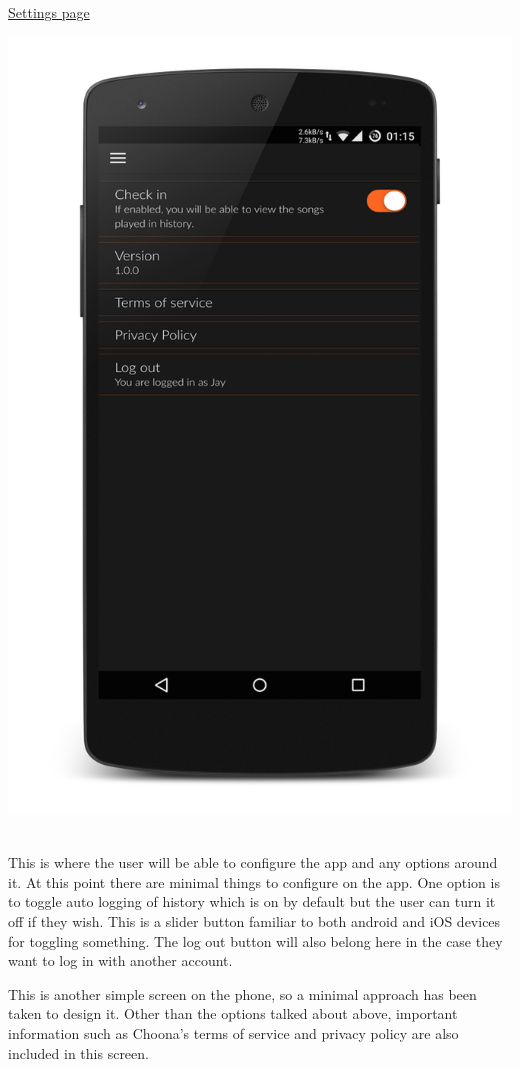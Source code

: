\noindent\underline{Settings page}\newline

\noindent
\begin{minipage}{\linewidth}
\centering
\includegraphics[scale=0.4]{./img/settingsframed.png}
\label{fig:settingspage}
\end{minipage}\\

This is where the user will be able to configure the app and any options around it. At this point there are minimal things to configure on the app. One option is to toggle auto logging of history which is on by default but the user can turn it off if they wish. This is a slider button familiar to both android and iOS devices for toggling something. The log out button will also belong here in the case they want to log in with another account. 

This is another simple screen on the phone, so a minimal approach has been taken to design it. Other than the options talked about above, important information such as Choona's terms of service and privacy policy are also included in this screen.